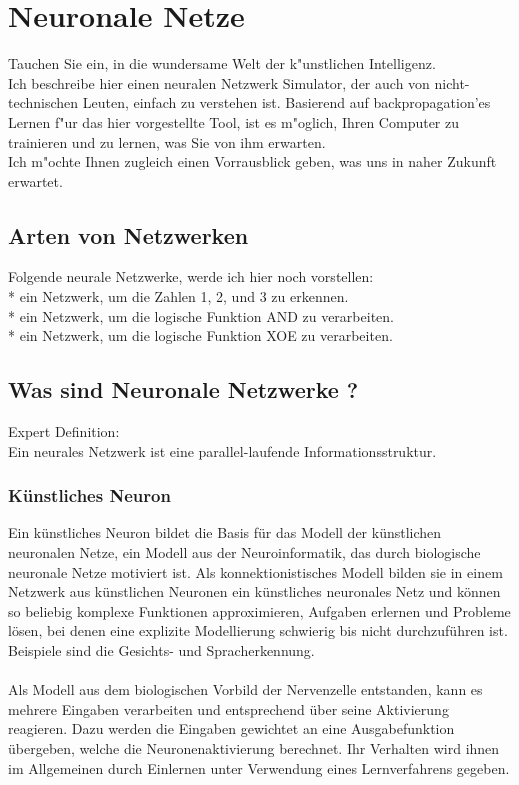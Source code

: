 \newpage
\chapter{Neuronale Netze}
Tauchen Sie ein, in die wundersame Welt der k"unstlichen Intelligenz. \\
Ich beschreibe hier einen neuralen Netzwerk Simulator, der auch von nicht-technischen Leuten,
einfach zu verstehen ist.
Basierend auf backpropagation'es Lernen f"ur das hier vorgestellte Tool, ist es m"oglich,
Ihren Computer zu trainieren und zu lernen, was Sie von ihm erwarten. \\
Ich m"ochte Ihnen zugleich einen Vorrausblick geben, was uns in naher Zukunft erwartet. \\

\section{Arten von Netzwerken}
Folgende neurale Netzwerke, werde ich hier noch vorstellen:\\
* ein Netzwerk, um die Zahlen 1, 2, und 3 zu erkennen. \\
* ein Netzwerk, um die logische Funktion AND zu verarbeiten. \\
* ein Netzwerk, um die logische Funktion XOE zu verarbeiten. \\

\section{Was sind Neuronale Netzwerke ?}
Expert Definition: \\
Ein neurales Netzwerk ist eine parallel-laufende Informationsstruktur.

\subsection{Künstliches Neuron}
Ein künstliches Neuron bildet die Basis für das Modell der künstlichen neuronalen Netze, ein Modell aus der Neuroinformatik, das durch biologische neuronale Netze motiviert ist. Als konnektionistisches Modell bilden sie in einem Netzwerk aus künstlichen Neuronen ein künstliches neuronales Netz und können so beliebig komplexe Funktionen approximieren, Aufgaben erlernen und Probleme lösen, bei denen eine explizite Modellierung schwierig bis nicht durchzuführen ist. Beispiele sind die Gesichts- und Spracherkennung.\\
\\
Als Modell aus dem biologischen Vorbild der Nervenzelle entstanden, kann es mehrere Eingaben verarbeiten und entsprechend über seine Aktivierung reagieren. Dazu werden die Eingaben gewichtet an eine Ausgabefunktion übergeben, welche die Neuronenaktivierung berechnet. Ihr Verhalten wird ihnen im Allgemeinen durch Einlernen unter Verwendung eines Lernverfahrens gegeben.
